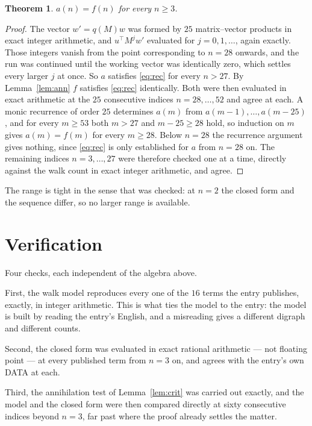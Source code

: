 \documentclass[11pt,a4paper]{article}
\theoremstyle{plain}
\newtheorem{theorem}{Theorem}
\theoremstyle{definition}
\begin{document}
\begin{theorem}
$a(n)=f(n)$ for every $n\ge3$.
\end{theorem}

\begin{proof}
The vector $w'=q(M)w$ was formed by $25$ matrix--vector products in exact integer
arithmetic, and $u^{\!\top}M^{j}w'$ evaluated for $j=0,1,\dots$, again exactly. Those integers
vanish from the point corresponding to $n=28$ onwards, and the run was continued until the
working vector was identically zero, which settles every larger $j$ at once. So $a$ satisfies
\eqref{eq:rec} for every $n>27$. By Lemma~\ref{lem:ann} $f$ satisfies \eqref{eq:rec}
identically. Both were then evaluated in exact arithmetic at the $25$ consecutive indices
$n=28,\dots,52$ and agree at each. A monic recurrence of order $25$
determines $a(m)$ from $a(m-1),\dots,a(m-25)$, and for every $m\ge53$ both
$m>27$ and $m-25\ge28$ hold, so induction on $m$ gives $a(m)=f(m)$ for every
$m\ge28$.
Below $n=28$ the recurrence argument gives nothing, since \eqref{eq:rec} is only
established for $a$ from $n=28$ on. The remaining indices $n=3,\dots,27$ were
therefore checked one at a time, directly against the walk count in exact integer arithmetic,
and agree.
\end{proof}

The range is tight in the sense that was checked: at $n=2$ the closed form and the sequence differ, so no larger range is available.

\section{Verification}

Four checks, each independent of the algebra above.

First, the walk model reproduces every one of the $16$ terms the entry publishes,
exactly, in integer arithmetic. This is what ties the model to the entry: the model is built
by reading the entry's English, and a misreading gives a different digraph and different
counts.

Second, the closed form was evaluated in exact rational arithmetic --- not floating point ---
at every published term from $n=3$ on, and agrees with the entry's own DATA at each.

Third, the annihilation test of Lemma~\ref{lem:crit} was carried out exactly, and the model
and the closed form were then compared directly at sixty consecutive indices beyond
$n=3$, far past where the proof already settles the matter.
\end{document}
